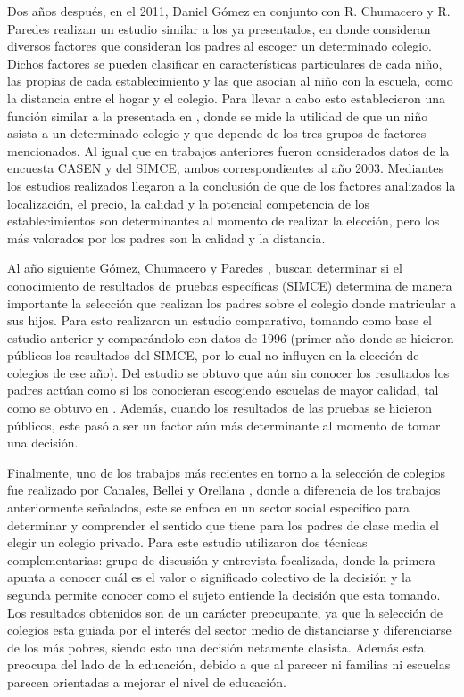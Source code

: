 Dos años después, en el 2011, Daniel Gómez en conjunto con R. Chumacero y R. Paredes \cite{Chumacero20111103} realizan un estudio similar a los ya presentados, en donde consideran diversos factores que consideran los padres al escoger un determinado colegio. Dichos factores se pueden clasificar en características particulares de cada niño, las propias de cada establecimiento y las que asocian al niño con la escuela, como la distancia entre el hogar y el colegio. Para llevar a cabo esto establecieron una función similar a la presentada en \cite{SAPELLI2002}, donde se mide la utilidad de que un niño asista a un determinado colegio y que depende de los tres grupos de factores mencionados. Al igual que en trabajos anteriores fueron considerados datos de la encuesta CASEN y del SIMCE, ambos correspondientes al año 2003. Mediantes los estudios realizados llegaron a la conclusión de que de los factores analizados la localización, el precio, la calidad y la potencial competencia de los establecimientos son determinantes al momento de realizar la elección, pero los más valorados por los padres son la calidad y la distancia.

Al año siguiente Gómez, Chumacero y Paredes \cite{GOMEZ2012}, buscan determinar si el conocimiento de resultados de pruebas específicas (SIMCE) determina de manera importante la selección que realizan los padres sobre el colegio donde matricular a sus hijos. Para esto realizaron un estudio comparativo, tomando como base el estudio anterior y comparándolo con datos de 1996 (primer año donde se hicieron públicos los resultados del SIMCE, por lo cual no influyen en la elección de colegios de ese año). Del estudio se obtuvo que aún sin conocer los resultados los padres actúan como si los conocieran escogiendo escuelas de mayor calidad, tal como se obtuvo en \cite{SAPELLI2002}. Además, cuando los resultados de las pruebas se hicieron públicos, este pasó a ser un factor aún más determinante al momento de tomar una decisión.

Finalmente, uno de los trabajos más recientes en torno a la selección de colegios fue realizado por Canales, Bellei y Orellana \cite{canalesque}, donde a diferencia de los trabajos anteriormente señalados, este se enfoca en un sector social específico para determinar y comprender el sentido que tiene para los padres de clase media el elegir un colegio privado. Para este estudio utilizaron dos técnicas complementarias: grupo de discusión y entrevista focalizada, donde la primera apunta a conocer cuál es el valor o significado colectivo de la decisión y la segunda permite conocer como el sujeto entiende la decisión que esta tomando. Los resultados obtenidos son de un carácter preocupante, ya que la selección de colegios esta guiada por el interés del sector medio de distanciarse y diferenciarse de los más pobres, siendo esto una decisión netamente clasista. Además esta preocupa del lado de la educación, debido a que al parecer ni familias ni escuelas parecen orientadas a mejorar el nivel de educación.